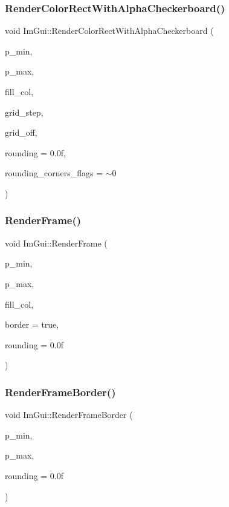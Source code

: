 \subsubsection{\texorpdfstring{Render\+Color\+Rect\+With\+Alpha\+Checkerboard()}{RenderColorRectWithAlphaCheckerboard()}}
{\footnotesize\ttfamily void Im\+Gui\+::\+Render\+Color\+Rect\+With\+Alpha\+Checkerboard (\begin{DoxyParamCaption}\item[{\hyperlink{struct_im_vec2}{Im\+Vec2}}]{p\+\_\+min,  }\item[{\hyperlink{struct_im_vec2}{Im\+Vec2}}]{p\+\_\+max,  }\item[{Im\+U32}]{fill\+\_\+col,  }\item[{float}]{grid\+\_\+step,  }\item[{\hyperlink{struct_im_vec2}{Im\+Vec2}}]{grid\+\_\+off,  }\item[{float}]{rounding = {\ttfamily 0.0f},  }\item[{int}]{rounding\+\_\+corners\+\_\+flags = {\ttfamily $\sim$0} }\end{DoxyParamCaption})}

\hypertarget{namespace_im_gui_a621ba649568ede3939d4f10d83b86d04}{}\label{namespace_im_gui_a621ba649568ede3939d4f10d83b86d04} 
\subsubsection{\texorpdfstring{Render\+Frame()}{RenderFrame()}}
{\footnotesize\ttfamily void Im\+Gui\+::\+Render\+Frame (\begin{DoxyParamCaption}\item[{\hyperlink{struct_im_vec2}{Im\+Vec2}}]{p\+\_\+min,  }\item[{\hyperlink{struct_im_vec2}{Im\+Vec2}}]{p\+\_\+max,  }\item[{Im\+U32}]{fill\+\_\+col,  }\item[{bool}]{border = {\ttfamily true},  }\item[{float}]{rounding = {\ttfamily 0.0f} }\end{DoxyParamCaption})}

\hypertarget{namespace_im_gui_adc76239c2006e66f8dab7638529a763d}{}\label{namespace_im_gui_adc76239c2006e66f8dab7638529a763d} 
\subsubsection{\texorpdfstring{Render\+Frame\+Border()}{RenderFrameBorder()}}
{\footnotesize\ttfamily void Im\+Gui\+::\+Render\+Frame\+Border (\begin{DoxyParamCaption}\item[{\hyperlink{struct_im_vec2}{Im\+Vec2}}]{p\+\_\+min,  }\item[{\hyperlink{struct_im_vec2}{Im\+Vec2}}]{p\+\_\+max,  }\item[{float}]{rounding = {\ttfamily 0.0f} }\end{DoxyParamCaption})}

